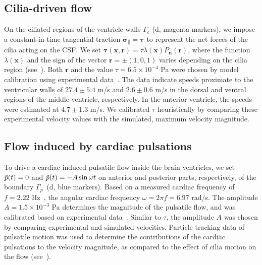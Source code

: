 \documentclass[fleqn]{wlscirep}
\newcommand{\Gc}{\Gamma_{c}}
\newcommand{\Gp}{\Gamma_{p}}
\newcommand{\nn}{\mathbf{n}}
\newcommand{\rr}{\mathbf{r}}
\newcommand{\xx}{\bm{x}}
\newcommand{\bsig}{\bm{\sigma}}
\newcommand{\bsigpar}{\hat{\bsig}_{\parallel}}
\newcommand{\btau}{\bm{\tau}}
\begin{document}
\subsection*{Cilia-driven flow}
On the ciliated regions of the ventricle walls $\Gc$ (d, magenta markers),
we impose a constant-in-time tangential traction $\bsigpar=\btau$ to represent the net forces
of the cilia acting on the CSF.
We set $\btau(\xx, \rr) = \tau \lambda(\xx) P_{\nn}(\rr)$, where the function $\lambda(\xx)$
and the sign of the vector $\rr=\pm(1, 0, 1)$ varies depending on the
cilia region (see~).
Both $\rr$ and the value $\tau=6.5\times 10^{-4}$ Pa were chosen by 
model calibration using experimental data~\cite{Olstad2019CiliaryDevelopment}.
The data indicate speeds proximate to the ventricular walls of $27.4 \pm 5.4$ \textmu m/s and
$2.6 \pm 0.6$ \textmu m/s in the dorsal and ventral regions of the middle ventricle, respectively.
In the anterior ventricle, the speeds were estimated at $4.7 \pm 1.3$ \textmu m/s.
We calibrated $\tau$ heuristically by comparing these experimental velocity values
with the simulated, maximum velocity magnitude.

\subsection*{Flow induced by cardiac pulsations}\label{subsec:pressure_bcs}
To drive a cardiac-induced pulsatile flow inside the brain ventricles, we set $\Tilde{p}(t)=0$ and
$\Tilde{p}(t)=-A\sin{\omega t}$ on anterior and posterior parts, respectively, of the
boundary $\Gp$~(d, blue markers).
Based on a measured cardiac frequency of $f=2.22$ Hz~\cite{Olstad2019CiliaryDevelopment},
the angular cardiac frequency $\omega=2\pi f=6.97$ rad/s.
The amplitude $A=1.5\times 10^{-3}$ Pa determines the magnitude of the pulsatile flow,
and was calibrated based on experimental data~\cite{Olstad2019CiliaryDevelopment}.
Similar to $\tau$, the amplitude $A$ was chosen by comparing experimental and simulated velocities.
Particle tracking data of pulsatile motion was used to determine the contributions of the
cardiac pulsations to the velocity magnitude,
as compared to the effect of cilia motion on the flow (see~).
\end{document}
